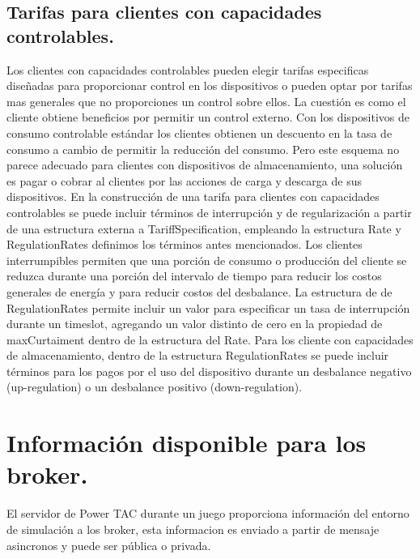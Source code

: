 \subsection{Tarifas para clientes con capacidades controlables.}

Los clientes con capacidades controlables pueden elegir tarifas especificas diseñadas para proporcionar control en los dispositivos o pueden optar por tarifas mas generales que no proporciones un control sobre ellos. La cuestión es como el cliente obtiene beneficios por permitir un control externo. Con los dispositivos de consumo controlable estándar los clientes obtienen un descuento en la tasa de consumo a cambio de permitir la reducción del consumo. Pero este esquema no parece adecuado para clientes con dispositivos de almacenamiento, una solución es pagar o cobrar al clientes por las acciones de carga y descarga de sus dispositivos. En la construcción de una tarifa para clientes con capacidades controlables se puede incluir términos de interrupción y de regularización a partir de una estructura externa a TariffSpecification, empleando la estructura Rate y RegulationRates definimos los términos antes mencionados. Los clientes interrumpibles permiten que una porción de consumo o producción del cliente se reduzca durante una porción del intervalo de tiempo para reducir los costos generales de energía y para reducir costos del desbalance. La estructura de de RegulationRates permite incluir un valor para especificar un tasa de interrupción durante un timeslot, agregando un valor distinto de cero en la propiedad de maxCurtaiment dentro de la estructura del Rate. Para los cliente con capacidades de almacenamiento, dentro de la estructura RegulationRates se puede incluir términos para los pagos por el uso del dispositivo durante un desbalance negativo (up-regulation) o un desbalance positivo (down-regulation).

\section{Información disponible para los broker.}

El servidor de Power TAC durante un juego proporciona información del entorno de simulación a los broker, esta informacion es enviado a partir de mensaje  asincronos y puede ser pública o privada.\\

